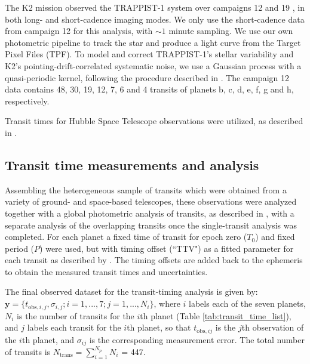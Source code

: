 \documentclass[twocolumn]{aastex63}
\begin{document}
The K2 mission \citep{Howell2014} observed the TRAPPIST-1 system over campaigns 12 and 19 \citep{Luger2017a}, in both long- and short-cadence imaging modes. We only use the short-cadence data from campaign 12 for this analysis, with $\sim1$ minute sampling. We use our own photometric pipeline to track the star and produce a light curve from the Target Pixel Files (TPF). To model and correct TRAPPIST-1's stellar variability and K2's pointing-drift-correlated systematic noise, we use a Gaussian process with a quasi-periodic kernel, following the procedure described in \cite{Grimm2018}. The campaign 12 data contains 48, 30, 19, 12, 7, 6 and 4 transits of planets b, c, d, e, f, g and h, respectively. %

Transit times for Hubble Space Telescope observations were utilized, as described in \citet{Grimm2018,deWit2016,deWit2018,Wakeford2018}.

\subsection{Transit time measurements and analysis}\label{sec:transit_time_measurements}


Assembling the heterogeneous sample of transits which were obtained from a variety of ground- and space-based telescopes,  these observations were analyzed together
with a global photometric analysis of transits, as described in
\citet{Ducrot2020}, with a separate analysis of the overlapping transits once the single-transit analysis was completed.
For each planet a fixed time of transit for epoch zero ($T_{0}$) and fixed period ($P$) were used, but with timing offset (``TTV") as a fitted parameter for each transit as described by \cite{Ducrot2020}.  The timing offsets are added back
to the ephemeris to obtain the measured transit times and uncertainties.

The final observed dataset for the transit-timing analysis
is given by: $\mathbf{y} = \{t_{\mathrm{obs},i,j},\sigma_{i,j}; i=1,...,7; j = 1,...,N_i\}$, where $i$ labels each of the seven planets, $N_i$ is
the number of transits for the $i$th planet (Table \ref{tab:transit_time_list}),
and $j$ labels each transit for the $i$th planet, so that
$t_{\mathrm{obs},ij}$ is the $j$th observation of the $i$th planet, and
$\sigma_{ij}$ is the corresponding measurement error.  The total number of transits is $N_\mathrm{trans} = \sum_{i=1}^{N_p} N_i$ = 447.
\end{document}
